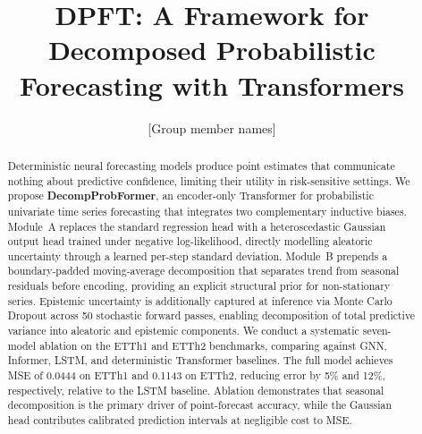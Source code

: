 \documentclass[runningheads]{llncs}
\begin{document}
\title{DPFT: A Framework for Decomposed Probabilistic Forecasting
with Transformers}


\author{[Group member names]}
\authorrunning{[Names]}

\maketitle

\begin{abstract}
Deterministic neural forecasting models produce point estimates that communicate nothing
about predictive confidence, limiting their utility in risk-sensitive settings.
We propose \textbf{DecompProbFormer}, an encoder-only Transformer for probabilistic
univariate time series forecasting that integrates two complementary inductive biases.
Module~A replaces the standard regression head with a heteroscedastic Gaussian output
head trained under negative log-likelihood, directly modelling aleatoric uncertainty
through a learned per-step standard deviation.
Module~B prepends a boundary-padded moving-average decomposition that separates
trend from seasonal residuals before encoding, providing an explicit structural prior
for non-stationary series.
Epistemic uncertainty is additionally captured at inference via Monte Carlo Dropout
across 50 stochastic forward passes, enabling decomposition of total predictive
variance into aleatoric and epistemic components.
We conduct a systematic seven-model ablation on the ETTh1 and ETTh2 benchmarks,
comparing against GNN, Informer, LSTM, and deterministic Transformer baselines.
The full model achieves MSE of 0.0444 on ETTh1 and 0.1143 on ETTh2, reducing
error by 5\% and 12\%, respectively, relative to the LSTM baseline.
Ablation demonstrates that seasonal decomposition is the primary driver of
point-forecast accuracy, while the Gaussian head contributes calibrated prediction
intervals at negligible cost to MSE.

\end{abstract}

\end{document}
